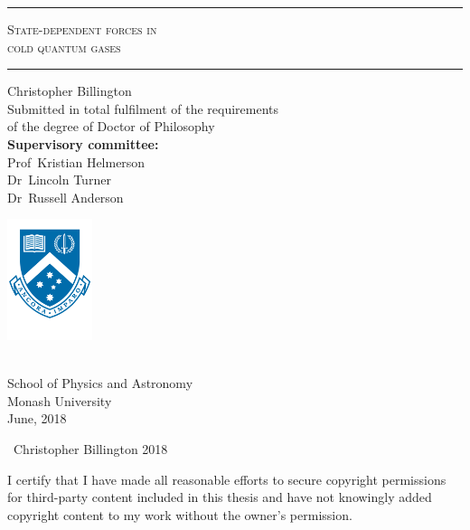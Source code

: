 \begin{titlingpage}
\thispagestyle{empty}
\begin{centering}
\rule{\textwidth}{1pt}\par
\vspace{0.5\baselineskip}
{\Huge\scshape State-dependent forces in \\ cold quantum gases\\}
\vspace{\baselineskip}
\rule{\textwidth}{1pt}\par
\vfill
{\Huge Christopher Billington}\\
\vfill
\Large Submitted in total fulfilment of the requirements\\
of the degree of Doctor of Philosophy\\
\vspace{\baselineskip}
\textbf{Supervisory committee:}\\
Prof~Kristian Helmerson\\
Dr~Lincoln Turner\\
Dr~Russell Anderson\\
\vfill
\begin{minipage}{3cm}
\centerfloat
\includegraphics[width=2.5cm]{figures/Monash_crest_A4.pdf}
\end{minipage}\\
{\Large School of Physics and Astronomy\\
Monash University\\
\vspace{\baselineskip}
June, 2018}\\
\end{centering}
\restoregeometry
\end{titlingpage}


\cleardoublepage

\vspace*{\fill}

\begin{center}
\begin{minipage}{0.95\textwidth}

\textcopyright\ Christopher Billington 2018 

\vspace{0.5\baselineskip}

I certify that I have made all reasonable efforts to secure copyright permissions for third-party content included in this thesis and have not knowingly added copyright content to my work without the owner's permission.

\end{minipage}
\end{center}

